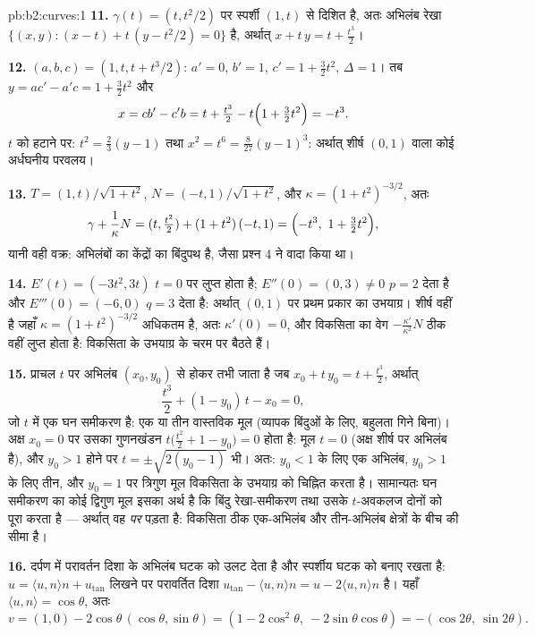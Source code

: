 \begin{solution}{pb:b2:curves:1}
\textbf{11.} $\gamma(t) = (t, t^2/2)$ पर स्पर्शी
$(1, t)$ से दिशित है, अतः अभिलंब रेखा $\{(x, y) : (x -
t) + t\,(y - t^2/2) = 0\}$ है, अर्थात् $x + t\,y = t +
\tfrac{t^3}2$।

\textbf{12.} $(a, b, c) = (1, t, t + t^3/2)$: $a' = 0$, $b' =
1$, $c' = 1 + \tfrac32 t^2$, $\Delta = 1$। तब $y = ac' -
a'c = 1 + \tfrac32t^2$ और
\[
x = cb' - c'b = t + \tfrac{t^3}2 - t\Bigl(1 +
\tfrac32t^2\Bigr) = -t^3 .
\]
$t$ को हटाने पर: $t^2 = \tfrac23(y - 1)$ तथा $x^2 = t^6 =
\tfrac8{27}(y - 1)^3$: अर्थात् शीर्ष
$(0, 1)$ वाला कोई अर्धघनीय परवलय।

\textbf{13.} $T = (1, t)/\sqrt{1+t^2}$, $N = (-t,
1)/\sqrt{1+t^2}$, और $\kappa = (1+t^2)^{-3/2}$, अतः
\[
\gamma + \frac1\kappa N = (t, \tfrac{t^2}2) +
(1+t^2)\,(-t, 1) = \Bigl(-t^3,\ 1 + \tfrac32t^2\Bigr),
\]
यानी वही वक्र: अभिलंबों का   केंद्रों का बिंदुपथ है,
जैसा प्रश्न 4 ने वादा किया था।

\textbf{14.} $E'(t) = (-3t^2, 3t)$ $t = 0$ पर लुप्त होता है;
$E''(0) = (0, 3) \neq 0$ $p = 2$ देता है और $E'''(0) = (-6,
0)$ $q = 3$ देता है: अर्थात् $(0, 1)$ पर प्रथम प्रकार का उभयाग्र।
शीर्ष वहीं है जहाँ $\kappa = (1+t^2)^{-3/2}$ अधिकतम है, अतः
$\kappa'(0) = 0$, और विकसिता का वेग
$-\frac{\kappa'}{\kappa^2}N$ ठीक वहीं लुप्त होता है: विकसिता के
उभयाग्र  के चरम पर बैठते हैं।

\textbf{15.} प्राचल $t$ पर अभिलंब $(x_0, y_0)$ से होकर तभी जाता है जब $x_0 + t\,y_0 = t + \tfrac{t^3}2$, अर्थात्
\[
\frac{t^3}2 + (1 - y_0)\,t - x_0 = 0 ,
\]
जो $t$ में एक घन समीकरण है: एक या तीन वास्तविक मूल (व्यापक
बिंदुओं के लिए, बहुलता गिने बिना)। अक्ष $x_0 = 0$ पर उसका
गुणनखंडन $t\bigl(\tfrac{t^2}2 + 1 - y_0\bigr) = 0$ होता है: मूल
$t = 0$ (अक्ष शीर्ष पर अभिलंब है), और $y_0 > 1$ होने पर
$t = \pm\sqrt{2(y_0 - 1)}$ भी। अतः: $y_0 < 1$ के लिए एक अभिलंब,
$y_0 > 1$ के लिए तीन, और $y_0 = 1$ पर त्रिगुण मूल विकसिता के
उभयाग्र को चिह्नित करता है। सामान्यतः घन समीकरण का कोई द्विगुण मूल
इसका अर्थ है कि बिंदु रेखा-समीकरण तथा उसके $t$-अवकलज दोनों को
पूरा करता है --- अर्थात् वह \emph{ पर} पड़ता है: विकसिता
ठीक एक-अभिलंब और तीन-अभिलंब क्षेत्रों के बीच की सीमा है।

\textbf{16.} दर्पण में परावर्तन दिशा के अभिलंब घटक को उलट
देता है और स्पर्शीय घटक को बनाए रखता है:
$u = \langle u, n\rangle n + u_{\mathrm{tan}}$ लिखने पर परावर्तित
दिशा $u_{\mathrm{tan}} - \langle u,
n\rangle n = u - 2\langle u, n\rangle n$ है। यहाँ $\langle u,
n\rangle = \cos\theta$, अतः
\[
v = (1, 0) - 2\cos\theta\,(\cos\theta, \sin\theta)
= (1 - 2\cos^2\theta,\ -2\sin\theta\cos\theta)
= -(\cos2\theta,\ \sin2\theta).
\]


\end{solution}

